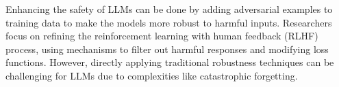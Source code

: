 \documentclass[11pt]{article}
\begin{document}
Enhancing the safety of LLMs can be done by adding adversarial examples to training data to make the models more robust to harmful inputs. Researchers focus on refining the reinforcement learning with human feedback (RLHF) process, using mechanisms to filter out harmful responses and modifying loss functions.  However, directly applying traditional robustness techniques can be challenging for LLMs due to complexities like catastrophic forgetting.


\begin{table*}\label{risk-mitigation-table}
\centering
{}
\end{table*}
\end{document}
